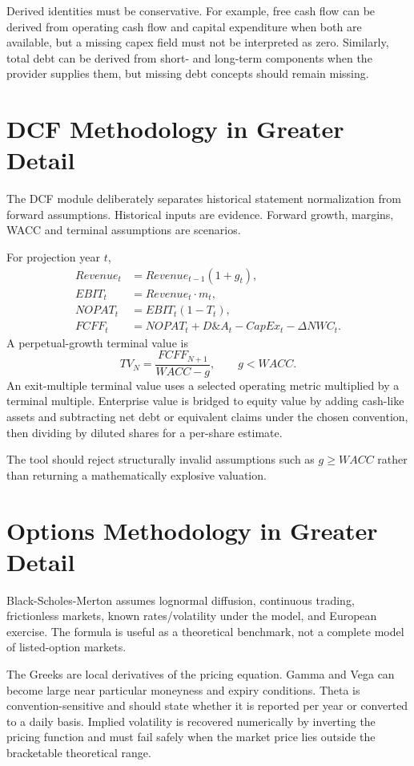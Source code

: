 \documentclass[11pt]{article}
\begin{document}
Derived identities must be conservative. For example, free cash flow can be derived from operating cash flow and capital expenditure when both are available, but a missing capex field must not be interpreted as zero. Similarly, total debt can be derived from short- and long-term components when the provider supplies them, but missing debt concepts should remain missing.

\section{DCF Methodology in Greater Detail}
The DCF module deliberately separates historical statement normalization from forward assumptions. Historical inputs are evidence. Forward growth, margins, WACC and terminal assumptions are scenarios.

For projection year $t$,
\begin{align}
Revenue_t &= Revenue_{t-1}(1+g_t),\\
EBIT_t &= Revenue_t\cdot m_t,\\
NOPAT_t &= EBIT_t(1-T_t),\\
FCFF_t &= NOPAT_t+D\&A_t-CapEx_t-\Delta NWC_t.
\end{align}
A perpetual-growth terminal value is
\begin{equation}
TV_N=\frac{FCFF_{N+1}}{WACC-g},\qquad g<WACC.
\end{equation}
An exit-multiple terminal value uses a selected operating metric multiplied by a terminal multiple. Enterprise value is bridged to equity value by adding cash-like assets and subtracting net debt or equivalent claims under the chosen convention, then dividing by diluted shares for a per-share estimate.

The tool should reject structurally invalid assumptions such as $g\ge WACC$ rather than returning a mathematically explosive valuation.

\section{Options Methodology in Greater Detail}
Black-Scholes-Merton assumes lognormal diffusion, continuous trading, frictionless markets, known rates/volatility under the model, and European exercise. The formula is useful as a theoretical benchmark, not a complete model of listed-option markets.

The Greeks are local derivatives of the pricing equation. Gamma and Vega can become large near particular moneyness and expiry conditions. Theta is convention-sensitive and should state whether it is reported per year or converted to a daily basis. Implied volatility is recovered numerically by inverting the pricing function and must fail safely when the market price lies outside the bracketable theoretical range.
\end{document}
